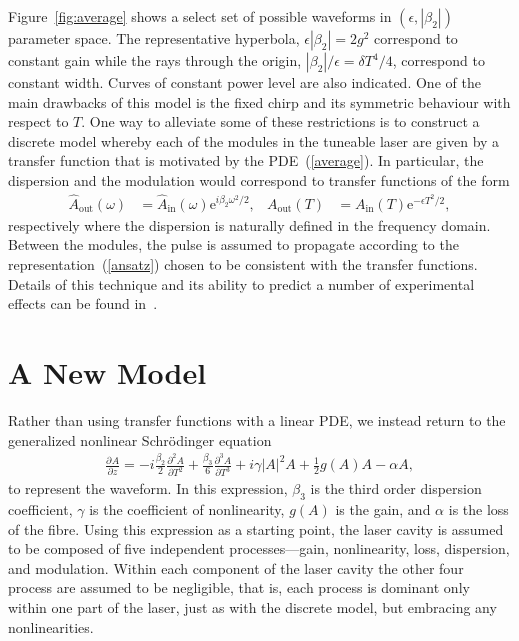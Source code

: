 \documentclass[12pt]{article}
\newcommand{\pdiff}[3][]{\frac{\partial^{#1}#2}{\partial{#3}^{#1}}}
\begin{document}
Figure~\ref{fig:average} shows a select set of possible waveforms in $(\epsilon,|\beta_2|)$ parameter space. The representative hyperbola, $\epsilon|\beta_2| = 2g^2$ correspond to constant gain while the rays through the origin, $|\beta_2|/\epsilon = \delta T^4/4$, correspond to constant width. Curves of constant power level are also indicated. One of the main drawbacks of this model is the fixed chirp and its symmetric behaviour with respect to $T$. One way to alleviate some of these restrictions is to construct a discrete model whereby each of the modules in the tuneable laser are given by a transfer function that is motivated by the PDE~(\ref{average}). In particular, the dispersion and the modulation would correspond to transfer functions of the form
\begin{align}
	\hat{A}_{\textrm{out}}(\omega) &= \hat{A}_{\textrm{in}}(\omega)\textrm{e}^{i\beta_2\omega^2/2},&
	A_{\textrm{out}}(T) &= A_{\textrm{in}}(T)\textrm{e}^{-\epsilon T^2/2},
\end{align}
respectively where the dispersion is naturally defined in the frequency domain. Between the modules, the pulse is assumed to propagate according to the representation~(\ref{ansatz}) chosen to be consistent with the transfer functions. Details of this technique and its ability to predict a number of experimental effects can be found in~\cite{burgoyne2014}.

\section{A New Model}
Rather than using transfer functions with a linear PDE, we instead return to the generalized nonlinear Schr\"odinger equation~\cite{agrawal2013, ferreira, shtyrina, yarutkina} 
\begin{align}
\label{eq:nlse}
\pdiff{A}{z} = - i \frac{\beta_2}{2}\pdiff[2]{A}{T} + \frac{\beta_3}{6}\pdiff[3]{A}{T} 
+ i \gamma |A|^2 A + \frac{1}{2}g(A) A - \alpha A,
\end{align}
to represent the waveform. In this expression, $\beta_3$ is the third order dispersion coefficient, $\gamma$ is the coefficient of nonlinearity, $g(A)$ is the gain, and $\alpha$ is the loss of the fibre. Using this expression as a starting point, the laser cavity is assumed to be composed of five independent processes---gain, nonlinearity, loss, dispersion, and modulation. Within each component of the laser cavity the other four process are assumed to be negligible, that is, each process is dominant only within one part of the laser, just as with the discrete model, but embracing any nonlinearities.
\end{document}
